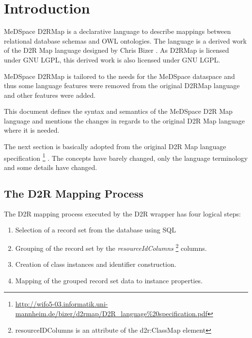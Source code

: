 \chapter{Introduction}

MeDSpace D2RMap is a declarative language to describe mappings between relational database schemas and OWL ontologies. The language is a derived work of the D2R Map language designed by Chris Bizer \cite{D2RMap}. As D2RMap is licensed under GNU LGPL, this derived work is also licensed under GNU LGPL. 

MeDSpace D2RMap is tailored to the needs for the MeDSpace dataspace and thus some language features were removed from the original D2RMap language and other features  were added.

This document defines the syntax and semantics of the MeDSpace D2R Map language and mentions the
changes in regards to the original D2R Map language where it is needed.

The next section is basically adopted from the original D2R Map language specification \footnote{
\href{http://wifo5-03.informatik.uni-mannheim.de/bizer/d2rmap/D2R\_language\%20specification.pdf}
{http://wifo5-03.informatik.uni-mannheim.de/bizer/d2rmap/D2R\_language\%20specification.pdf} 
}
. The concepts have barely changed, only the language terminology and some details have changed.

\section{The D2R Mapping Process}

The D2R mapping process executed by the D2R wrapper has four logical steps:

\begin{enumerate}  
	\item Selection of a record set from the database using SQL 
	\item Grouping of the record set by the \textit{resourceIdColumns} \footnote{resourceIDColumns is an attribute of the d2r:ClassMap element}
	columns. 
	\item Creation of class instances and identifier construction. 
	\item Mapping of the grouped record set data to instance properties.
\end{enumerate}

